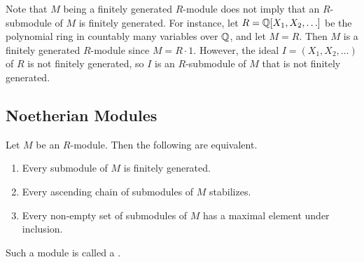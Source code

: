 \begin{example}
    Note that $M$ being a finitely generated $R$-module does not imply that an $R$-submodule of $M$ is finitely generated. For instance, let $R = \mathbb{Q}[X_{1},X_{2},\ldots]$ be the polynomial ring in countably many variables over $\mathbb{Q}$, and let $M = R$. Then $M$ is a finitely generated $R$-module since $M = R \cdot 1$. However, the ideal $I = (X_{1},X_{2},\ldots)$ of $R$ is not finitely generated, so $I$ is an $R$-submodule of $M$ that is not finitely generated.
\end{example}

\subsection{Noetherian Modules}

\begin{proposition}
    Let $M$ be an $R$-module. Then the following are equivalent.
    \begin{enumerate}[label=\arabic*.]
        \item Every submodule of $M$ is finitely generated.
        \item Every ascending chain of submodules of $M$ stabilizes.
        \item Every non-empty set of submodules of $M$ has a maximal element under inclusion.
    \end{enumerate}
\end{proposition}

Such a module is called a .

